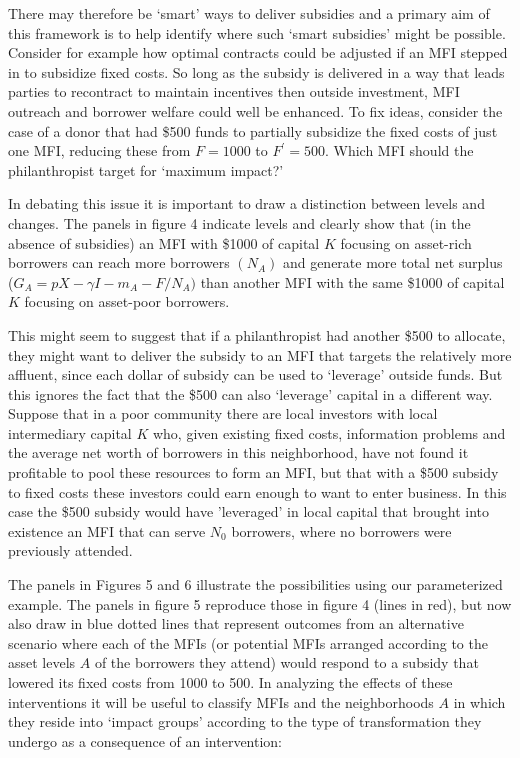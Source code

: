 \documentclass[letterpaper, 12pt]{article}
\begin{document}
There may therefore be `smart' ways to deliver subsidies and a primary
aim of this framework is to help identify where such `smart subsidies'
might be possible. Consider for example how optimal contracts could be
adjusted if an MFI stepped in to subsidize fixed costs. So long as the
subsidy is delivered in a way that leads parties to recontract to
maintain incentives then outside investment, MFI outreach and borrower
welfare could well be enhanced. To fix ideas, consider the case of a
donor that had \$500 funds to partially subsidize the fixed costs of
just one MFI, reducing these from \(F = 1000\) to \(F^{'} = 500.\) Which
MFI should the philanthropist target for `maximum impact?'

In debating this issue it is important to draw a distinction between
levels and changes. The panels in figure 4 indicate levels and clearly
show that (in the absence of subsidies) an MFI with \$1000 of capital
\(K\) focusing on asset-rich borrowers can reach more borrowers
\((N_{A})\) and generate more total net surplus
(\(G_{A} = pX - \gamma I - m_{A} - F/N_{A})\) than another MFI with the
same \$1000 of capital \(K\) focusing on asset-poor borrowers.

This might seem to suggest that if a philanthropist had another \$500 to
allocate, they might want to deliver the subsidy to an MFI that targets
the relatively more affluent, since each dollar of subsidy can be used
to `leverage' outside funds. But this ignores the fact that the \$500
can also `leverage' capital in a different way. Suppose that in a poor
community there are local investors with local intermediary capital
\(K\) who, given existing fixed costs, information problems and the
average net worth of borrowers in this neighborhood, have not found it
profitable to pool these resources to form an MFI, but that with a \$500
subsidy to fixed costs these investors could earn enough to want to
enter business. In this case the \$500 subsidy would have 'leveraged' in
local capital that brought into existence an MFI that can serve
\(N_{0}\) borrowers, where no borrowers were previously attended.

The panels in Figures 5 and 6 illustrate the possibilities using our
parameterized example. The panels in figure 5 reproduce those in figure
4 (lines in red), but now also draw in blue dotted lines that represent
outcomes from an alternative scenario where each of the MFIs (or
potential MFIs arranged according to the asset levels \(A\) of the
borrowers they attend) would respond to a subsidy that lowered its fixed
costs from 1000 to 500. In analyzing the effects of these interventions
it will be useful to classify MFIs and the neighborhoods \(A\) in which
they reside into `impact groups' according to the type of transformation
they undergo as a consequence of an intervention:
\end{document}
